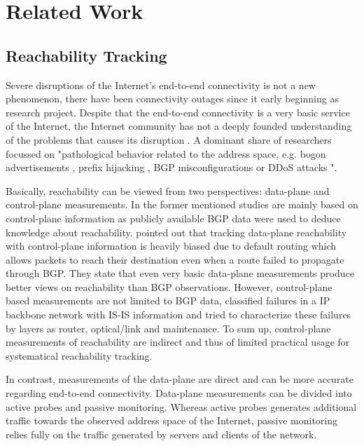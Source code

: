 \section{Related Work\label{sec:related_work}}
\subsection{Reachability Tracking}
Severe disruptions of the Internet's end-to-end connectivity is not a new phenomenon, there have been connectivity outages since it early beginning as research project. Despite that the end-to-end connectivity is a very basic service of the Internet, the Internet community has not a deeply founded understanding of the problems that causes its disruption \citep{Bush:Optometry}. A dominant share of researchers focussed on "pathological behavior related to the address space, e.g. bogon advertisements \citep{Feamster:2005}, prefix hijacking \citep{Zhang:2010}, BGP misconfigurations \citep{Mahajan:2002} or DDoS attacks \citep{Chen:2001}"\citep{Bush:Optometry}.

Basically, reachability can be viewed from two perspectives: data-plane and control-plane measurements. In the former mentioned studies are mainly based on control-plane information as publicly available BGP data were used to deduce knowledge about reachability. \citet{Bush:Optometry} pointed out that tracking data-plane reachability with control-plane information is heavily biased due to default routing which allows packets to reach their destination even when a route failed to propagate through BGP. They state that even very basic data-plane measurements produce better views on reachability than BGP observations. However, control-plane based measurements are not limited to BGP data, \citet{Markopoulou:2008} classified failures in a IP backbone network with IS-IS information and tried to characterize these failures by layers as router, optical/link and maintenance. To sum up, control-plane measurements of reachability are indirect and thus of limited practical usage for systematical reachability tracking.

In contrast, measurements of the data-plane are direct and can be more accurate regarding end-to-end connectivity. Data-plane measurements can be divided into active probes and passive monitoring. Whereas active probes generates additional traffic towards the observed address space of the Internet, passive monitoring relies fully on the traffic generated by servers and clients of the network.

